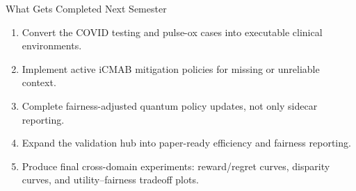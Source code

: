 \begin{frame}{What Gets Completed Next Semester}
\begin{enumerate}
\item Convert the COVID testing and pulse-ox cases into executable clinical environments.
\item Implement active iCMAB mitigation policies for missing or unreliable context.
\item Complete fairness-adjusted quantum policy updates, not only sidecar reporting.
\item Expand the validation hub into paper-ready efficiency and fairness reporting.
\item Produce final cross-domain experiments: reward/regret curves, disparity curves, and utility--fairness tradeoff plots.
\end{enumerate}
\end{frame}

